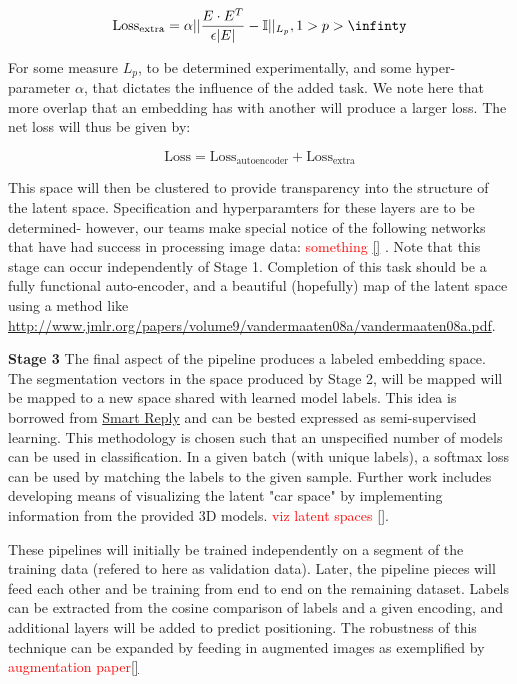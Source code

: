 \documentclass[twocolumn]{article}
\newcommand{\todo}[1]{\textcolor{red}{#1}}
\begin{document}
  $$\text{Loss}_\text{extra} = \alpha ||\frac{E\cdot E^T}{\epsilon |E|} - \mathbb{I}||_{L_p}, 1 > p > \infinty$$
  
  For some measure $L_p$, to be determined experimentally, and some
  hyper-parameter $\alpha$, that dictates the influence of the added task. We
  note here that more overlap that an embedding has with another will produce a
  larger loss. The net loss will thus be given by:

  $$\text{Loss} = \text{Loss}_\text{autoencoder} + \text{Loss}_\text{extra}$$

  This space will then be clustered to provide transparency into the structure
  of the latent space.  Specification and hyperparamters for these layers are to be determined-
  however, our teams make special notice of the following networks that have had
  success in processing image data: \todo{something \ref{}} . Note that this stage can occur
  independently of Stage 1. Completion of this task should be a fully functional
  auto-encoder, and a beautiful (hopefully) map of the latent space using a
  method like
  \href{tsne}{http://www.jmlr.org/papers/volume9/vandermaaten08a/vandermaaten08a.pdf}.

  \textbf{Stage 3} The final aspect of the pipeline produces a labeled embedding
  space.  
  The segmentation vectors in the space produced by Stage 2, will be mapped will
  be mapped to a new space shared with learned model labels. This
  idea is borrowed from \href{https://arxiv.org/pdf/1705.00652.pdf}{Smart Reply} and can be bested expressed as semi-supervised
  learning. This methodology is chosen such that an unspecified number of models
  can be used in classification. In a given batch (with unique labels), a
  softmax loss can be used by matching the labels to the given sample.
  Further work includes developing means of
  visualizing the latent "car space" by implementing information from the
  provided 3D models.  \todo{viz latent spaces \ref{}}.

  These pipelines will initially be trained independently on a segment of the
  training data (refered to here as validation data). Later, the pipeline pieces
  will feed each other and be training from end to end on the remaining dataset.
  Labels can be extracted from the cosine comparison of labels and a given
  encoding, and additional layers will be added to predict positioning. The
  robustness of this technique can be expanded by feeding in augmented images as
  exemplified by \todo{augmentation paper\ref{}}
\end{document}
